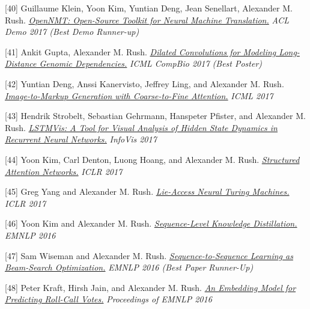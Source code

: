 \documentclass[10pt]{article}
\begin{document}
\medskip


[40] \ind Guillaume Klein, Yoon Kim, Yuntian Deng, Jean Senellart, Alexander M. Rush. \emph{\href{ https://arxiv.org/abs/1701.02810 }{ OpenNMT: Open-Source Toolkit for Neural Machine Translation.} }\emph{ ACL Demo 2017 (Best Demo Runner-up) }

\medskip


[41] \ind Ankit Gupta, Alexander M. Rush. \emph{\href{ https://arxiv.org/abs/1710.01278 }{ Dilated Convolutions for Modeling Long-Distance Genomic Dependencies.} }\emph{ ICML CompBio 2017 (Best Poster) }

\medskip


[42] \ind Yuntian Deng, Anssi Kanervisto, Jeffrey Ling, and Alexander M. Rush. \emph{\href{ http://lstm.seas.harvard.edu/latex/ }{ Image-to-Markup Generation with Coarse-to-Fine Attention.} }\emph{ ICML 2017 }

\medskip


[43] \ind Hendrik Strobelt, Sebastian Gehrmann, Hanspeter Pfister, and Alexander M. Rush. \emph{\href{ http://lstm.seas.harvard.edu/ }{ LSTMVis: A Tool for Visual Analysis of Hidden State Dynamics in Recurrent Neural Networks.} }\emph{ InfoVis 2017 }

\medskip


[44] \ind Yoon Kim, Carl Denton, Luong Hoang, and Alexander M. Rush. \emph{\href{ https://arxiv.org/abs/1702.00887 }{ Structured Attention Networks.} }\emph{ ICLR 2017 }

\medskip


[45] \ind Greg Yang and Alexander M. Rush. \emph{\href{ http://lstm.seas.harvard.edu/lantm/ }{ Lie-Access Neural Turing Machines.} }\emph{ ICLR 2017 }

\medskip


[46] \ind Yoon Kim and Alexander M. Rush. \emph{\href{ http://arxiv.org/pdf/1606.07947v1.pdf }{ Sequence-Level Knowledge Distillation.} }\emph{ EMNLP 2016 }

\medskip


[47] \ind Sam Wiseman and Alexander M. Rush. \emph{\href{ http://arxiv.org/pdf/1606.02960.pdf }{ Sequence-to-Sequence Learning as Beam-Search Optimization.} }\emph{ EMNLP 2016 (Best Paper Runner-Up) }

\medskip


[48] \ind Peter Kraft, Hirsh Jain, and Alexander M. Rush. \emph{\href{ https://www.aclweb.org/anthology/D/D16/D16-1221.pdf }{ An Embedding Model for Predicting Roll-Call Votes.} }\emph{ Proceedings of EMNLP 2016 }
\end{document}
